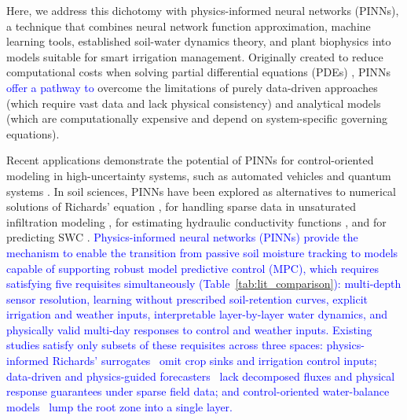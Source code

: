 \documentclass[pdflatex,sn-nature]{sn-jnl}%
\theoremstyle{thmstyleone}%
\theoremstyle{thmstyletwo}%
\theoremstyle{thmstylethree}%
\begin{document}
Here, we address this dichotomy with physics-informed neural networks (PINNs), a technique that combines neural network function approximation, machine learning tools, established soil-water dynamics theory, and plant biophysics into models suitable for smart irrigation management. Originally created to reduce computational costs when solving partial differential equations (PDEs)  \cite{Cuomo2022}, PINNs \textcolor{blue}{offer a pathway to} overcome the limitations of purely data-driven approaches (which require vast data and lack physical consistency) and analytical models (which are computationally expensive and depend on system-specific governing equations).


Recent applications demonstrate the potential of PINNs for control-oriented modeling in high-uncertainty systems, such as automated vehicles and quantum systems \cite{Li2024, Zhang2025}. In soil sciences, PINNs have been explored as alternatives to numerical solutions of Richards' equation \cite{Bandai2022}, for handling sparse data in unsaturated infiltration modeling \cite{Lan2024}, for estimating hydraulic conductivity functions \cite{Elkha2024}, and for predicting SWC \cite{Bagheri2025}. \textcolor{blue}{Physics-informed neural networks (PINNs) provide the mechanism to enable the transition from passive soil moisture tracking to models capable of supporting robust model predictive control (MPC), which requires satisfying five requisites simultaneously (Table~\ref{tab:lit_comparison}): multi-depth sensor resolution, learning without prescribed soil-retention curves, explicit irrigation and weather inputs, interpretable layer-by-layer water dynamics, and physically valid multi-day responses to control and weather inputs. Existing studies satisfy only subsets of these requisites across three spaces: physics-informed Richards' surrogates~\cite{Bandai2022, Lan2024, Elkha2024, Bandai2024, Ye2025} omit crop sinks and irrigation control inputs; data-driven and physics-guided forecasters~\cite{Zou2010, Murcia2024, Bagheri2025, WangY2023, ZhangT2025, Jiang2025, Jiang2026} lack decomposed fluxes and physical response guarantees under sparse field data; and control-oriented water-balance models~\cite{condeforecast2024} lump the root zone into a single layer.}
\end{document}
